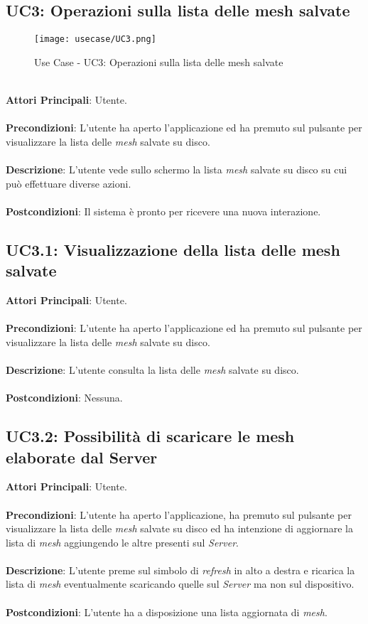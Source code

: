 \subsection{UC3: Operazioni sulla lista delle mesh salvate}
\begin{figure}[!h] 
    \centering 
    \texttt{[image: usecase/UC3.png]} 
    \caption{Use Case - UC3: Operazioni sulla lista delle mesh salvate}
\end{figure}
\ \\
\textbf{Attori Principali}: Utente.
\\\\ \textbf{Precondizioni}: L'utente ha aperto l'applicazione ed ha premuto sul pulsante per visualizzare la lista delle \emph{mesh} salvate su disco.
\\\\ \textbf{Descrizione}: L'utente vede sullo schermo la lista \emph{mesh} salvate su disco su cui può effettuare diverse azioni.
\\\\ \textbf{Postcondizioni}: Il sistema è pronto per ricevere una nuova interazione.




\subsection{UC3.1: Visualizzazione della lista delle mesh salvate}
\textbf{Attori Principali}: Utente.
\\\\ \textbf{Precondizioni}: L'utente ha aperto l'applicazione ed ha premuto sul pulsante per visualizzare la lista delle \emph{mesh} salvate su disco.
\\\\ \textbf{Descrizione}:  L'utente consulta la lista delle \emph{mesh} salvate su disco.
\\\\ \textbf{Postcondizioni}: Nessuna.

\subsection{UC3.2: Possibilità di scaricare le mesh elaborate dal Server}
\textbf{Attori Principali}: Utente.
\\\\ \textbf{Precondizioni}: L'utente ha aperto l'applicazione, ha premuto sul pulsante per visualizzare la lista delle \emph{mesh} salvate su disco ed ha intenzione di aggiornare la lista di \emph{mesh} aggiungendo le altre presenti sul \emph{Server}.
\\\\ \textbf{Descrizione}: L'utente preme sul simbolo di \emph{refresh} in alto a destra e ricarica la lista di \emph{mesh} eventualmente scaricando quelle sul \emph{Server} ma non sul dispositivo.
\\\\ \textbf{Postcondizioni}: L'utente ha a disposizione una lista aggiornata di \emph{mesh}.

